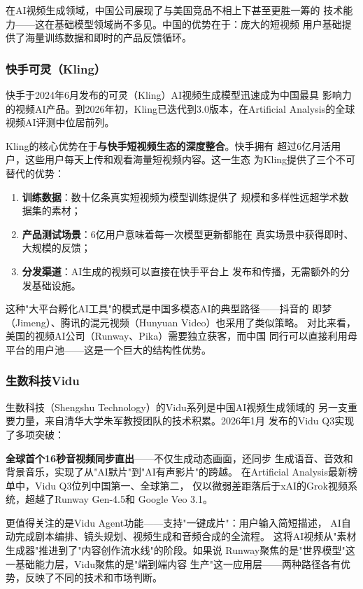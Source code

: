 在AI视频生成领域，中国公司展现了与美国竞品不相上下甚至更胜一筹的
技术能力——这在基础模型领域尚不多见。中国的优势在于：庞大的短视频
用户基础提供了海量训练数据和即时的产品反馈循环。

\subsubsection{快手可灵（Kling）}
快手于2024年6月发布的可灵（Kling）AI视频生成模型迅速成为中国最具
影响力的视频AI产品。到2026年初，Kling已迭代到3.0版本，在Artificial
Analysis的全球视频AI评测中位居前列。

Kling的核心优势在于\textbf{与快手短视频生态的深度整合}。快手拥有
超过6亿月活用户，这些用户每天上传和观看海量短视频内容。这一生态
为Kling提供了三个不可替代的优势：
\begin{enumerate}
  \item \textbf{训练数据}：数十亿条真实短视频为模型训练提供了
    规模和多样性远超学术数据集的素材；
  \item \textbf{产品测试场景}：6亿用户意味着每一次模型更新都能在
    真实场景中获得即时、大规模的反馈；
  \item \textbf{分发渠道}：AI生成的视频可以直接在快手平台上
    发布和传播，无需额外的分发基础设施。
\end{enumerate}

这种"大平台孵化AI工具"的模式是中国多模态AI的典型路径——抖音的
即梦（Jimeng）、腾讯的混元视频（Hunyuan Video）也采用了类似策略。
对比来看，美国的视频AI公司（Runway、Pika）需要独立获客，而中国
同行可以直接利用母平台的用户池——这是一个巨大的结构性优势。

\subsubsection{生数科技Vidu}
生数科技（Shengshu Technology）的Vidu系列是中国AI视频生成领域的
另一支重要力量，来自清华大学朱军教授团队的技术积累。2026年1月
发布的Vidu Q3实现了多项突破：

\textbf{全球首个16秒音视频同步直出}——不仅生成动态画面，还同步
生成语音、音效和背景音乐，实现了从"AI默片"到"AI有声影片"的跨越。
在Artificial Analysis最新榜单中，Vidu Q3位列中国第一、全球第二，
仅以微弱差距落后于xAI的Grok视频系统，超越了Runway Gen-4.5和
Google Veo 3.1。

更值得关注的是Vidu Agent功能——支持"一键成片"：用户输入简短描述，
AI自动完成剧本编排、镜头规划、视频生成和音频合成的全流程。
这将AI视频从"素材生成器"推进到了"内容创作流水线"的阶段。如果说
Runway聚焦的是"世界模型"这一基础能力层，Vidu聚焦的是"端到端内容
生产"这一应用层——两种路径各有优势，反映了不同的技术和市场判断。

